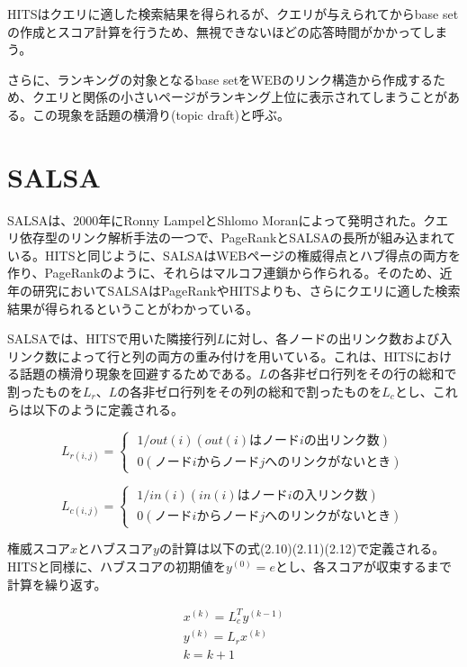 \documentclass[a4paper,11pt]{jreport}
\begin{document}
HITSはクエリに適した検索結果を得られるが、クエリが与えられてからbase setの作成とスコア計算を行うため、無視できないほどの応答時間がかかってしまう。

さらに、ランキングの対象となるbase setをWEBのリンク構造から作成するため、クエリと関係の小さいページがランキング上位に表示されてしまうことがある。この現象を話題の横滑り(topic draft)と呼ぶ。

\section{SALSA}

SALSAは、2000年にRonny LampelとShlomo Moranによって発明された。クエリ依存型のリンク解析手法の一つで、PageRankとSALSAの長所が組み込まれている。HITSと同じように、SALSAはWEBページの権威得点とハブ得点の両方を作り、PageRankのように、それらはマルコフ連鎖から作られる。そのため、近年の研究においてSALSAはPageRankやHITSよりも、さらにクエリに適した検索結果が得られるということがわかっている。

SALSAでは、HITSで用いた隣接行列$L$に対し、各ノードの出リンク数および入リンク数によって行と列の両方の重み付けを用いている。これは、HITSにおける話題の横滑り現象を回避するためである。$L$の各非ゼロ行列をその行の総和で割ったものを$L_r$、$L$の各非ゼロ行列をその列の総和で割ったものを$L_c$とし、これらは以下のように定義される。

\begin{equation}
L_{r(i,j)} =
\begin{cases}
\; 1/out(i)　(out(i)はノードiの出リンク数) \\
\; 0　(ノードiからノードjへのリンクがないとき)
\end{cases}
\end{equation}

\begin{equation}
L_{c(i,j)} =
\begin{cases}
\; 1/in(i)　(in(i)はノードiの入リンク数) \\
\; 0　(ノードiからノードjへのリンクがないとき)
\end{cases}
\end{equation}

権威スコア$x$とハブスコア$y$の計算は以下の式(2.10)(2.11)(2.12)で定義される。
HITSと同様に、ハブスコアの初期値を$y^(0) = e$とし、各スコアが収束するまで計算を繰り返す。

\begin{eqnarray}
x^{(k)} = L_c^Ty^{(k-1)} \\
y^{(k)} = L_rx^{(k)} \\
k = k + 1
\end{eqnarray}
\end{document}
